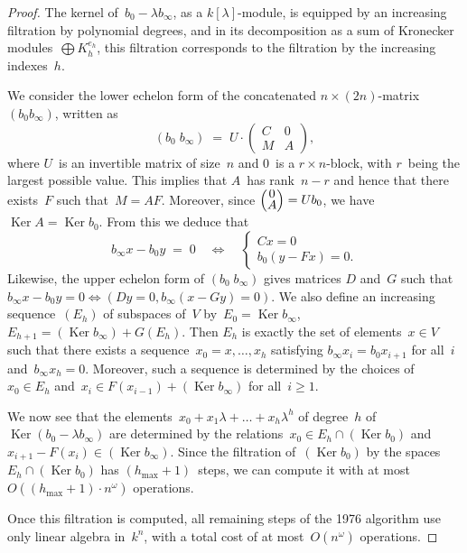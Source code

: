 \documentclass{amsart}
\def\mat#1{\begin{pmatrix}#1\end{pmatrix}}
\def\smat{\def\arraystretch{.66}\mat}
\DeclareMathOperator\Ker{Ker}
\begin{document}
\begin{proof}
The kernel of~$b_0 - λ b_∞$, as a $k[λ]$-module,
is equipped by an increasing filtration by polynomial degrees,
and in its decomposition as a sum of Kronecker modules~$⨁ K_h^{e_h}$,
this filtration corresponds to the filtration by the increasing
indexes~$h$.

\medbreak

We consider the lower echelon form
of the concatenated $n × (2n)$-matrix $(b_0 b_∞)$, written as
\begin{equation}
(b_0 \; b_∞) \;=\; U · \mat{C & 0 \\ M & A},
\end{equation}
where $U$~is an invertible matrix of size~$n$
and $0$~is a $r × n$-block, with $r$~being the largest possible value.
This implies that $A$~has rank~$n-r$ and hence that
there exists~$F$ such that~$M = A F$.
Moreover, since $\smat{0\\A} = U b_0$, we have~$\Ker A = \Ker b_0$.
From this we deduce that
\begin{equation}
b_∞ x - b_0 y \;=\; 0 \quad ⇔ \quad
  \begin{cases} C x = 0 \\ b_0 (y - F x) = 0.\end{cases}
\end{equation}
Likewise, the upper echelon form of $(b_0\;b_∞)$
gives matrices $D$ and~$G$ such that
$b_∞ x - b_0 y = 0 ⇔ (D y = 0, b_∞ (x - G y) = 0)$.
We also define an increasing sequence~$(E_h)$ of subspaces of~$V$
by~$E_0 = \Ker b_∞$, $E_{h+1} = (\Ker b_∞) + G(E_h)$.
Then $E_h$ is exactly the set of elements~$x ∈ V$ such that there exists
a sequence~$x_0 = x, …, x_h$ satisfying $b_∞ x_i = b_0 x_{i+1}$ for all~$i$
and~$b_∞ x_h = 0$.
Moreover, such a sequence is determined by the choices
of~$x_0 ∈ E_h$ and~$x_{i} ∈ F(x_{i-1}) + (\Ker b_∞)$ for all~$i ≥ 1$.

We now see that the elements~$x_0 + x_1 λ + … + x_h λ^h$
of degree~$h$ of~$\Ker(b_0 - λ b_∞)$
are determined by the relations~$x_0 ∈ E_{h} ∩ (\Ker b_0)$
and~$x_{i+1} - F (x_i) ∈ (\Ker b_∞)$.
Since the filtration of~$(\Ker b_0)$ by the spaces~$E_{h} ∩ (\Ker b_0)$
has $(h_{\max} + 1)$~steps,
we can compute it with at most~$O((h_{\max}+1) · n^{ω})$ operations.

Once this filtration is computed,
all remaining steps of the 1976 algorithm use only linear algebra in~$k^n$,
with a total cost of at most~$O(n^ω)$ operations.
\end{proof}
\end{document}
